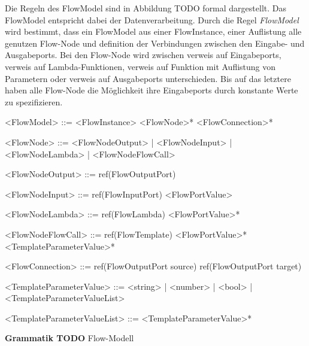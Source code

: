 \documentclass{article}
\begin{document}
    Die Regeln des FlowModel sind in Abbildung TODO formal dargestellt. Das FlowModel entspricht dabei der Datenverarbeitung. \cite{99}
    Durch die Regel \textit{FlowModel} wird bestimmt, dass ein FlowModel aus einer FlowInstance, einer Auflistung alle genutzen Flow-Node und definition der Verbindungen zwischen den Eingabe- und Ausgabeports.
    Bei den Flow-Node wird zwischen verweis auf Eingabeports, verweis auf Lambda-Funktionen, verweis auf Funktion mit Auflistung von Parametern oder verweis auf Ausgabeports unterschieden.
    Bis auf das letztere haben alle Flow-Node die Möglichkeit ihre Eingabeports durch konstante Werte zu spezifizieren.\\
    \begin{grammar}
        <FlowModel> ::= <FlowInstance> <FlowNode>* <FlowConnection>*

        <FlowNode> ::= <FlowNodeOutput> | <FlowNodeInput> | <FlowNodeLambda> | <FlowNodeFlowCall>
       
        <FlowNodeOutput> ::= ref(FlowOutputPort)

        <FlowNodeInput> ::= ref(FlowInputPort) <FlowPortValue>

        <FlowNodeLambda> ::= ref(FlowLambda) <FlowPortValue>*

        <FlowNodeFlowCall> ::= ref(FlowTemplate) <FlowPortValue>* <TemplateParameterValue>*
    
        <FlowConnection> ::= ref(FlowOutputPort source) ref(FlowOutputPort target)
    
        <TemplateParameterValue> ::= <string> | <number> | <bool> | <TemplateParameterValueList>
    
        <TemplateParameterValueList> ::= <TemplateParameterValue>*
    \end{grammar}
    \textbf{Grammatik TODO} Flow-Modell
\end{document}

